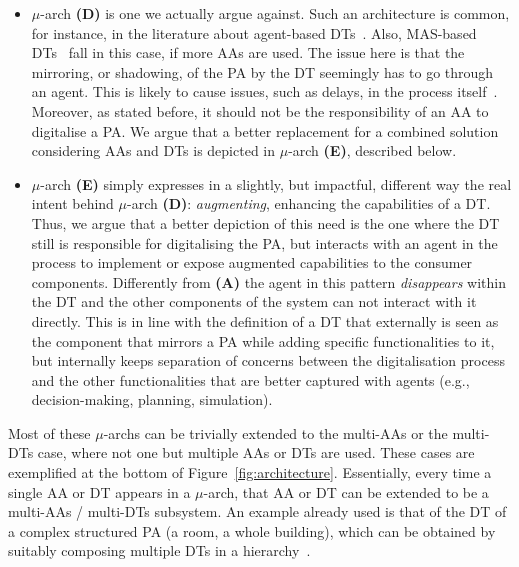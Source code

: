 \begin{itemize}
    \item $\mu$-arch \textbf{(D)} is one we actually argue against. 
    Such an architecture is common, for instance, in the literature about agent-based DTs~\cite{AlelaimatGD20,s21041096}. 
    Also, MAS-based DTs~\cite{WAN2021880,Pretel2024} fall in this case, if more AAs are used. 
    The issue here is that the mirroring, or shadowing, of the PA by the DT seemingly has to go through an agent. 
    This is likely to cause issues, such as delays, in the process itself~\cite{calvaresi2017challenge}. 
    Moreover, as stated before, it should not be the responsibility of an AA to digitalise a PA. 
    We argue that a better replacement for a combined solution considering AAs and DTs is depicted in $\mu$-arch \textbf{(E)}, described below. 
    \item $\mu$-arch \textbf{(E)} simply expresses in a slightly, but impactful, different way the real intent behind $\mu$-arch \textbf{(D)}: \emph{augmenting}, enhancing the capabilities of a DT. 
    Thus, we argue that a better depiction of this need is the one where the DT still is responsible for digitalising the PA, but interacts with an agent in the process to implement or expose augmented capabilities to the consumer components.
    Differently from \textbf{(A)} the agent in this pattern \textit{disappears} within the DT and the other components of the system can not interact with it directly. This is in line with the definition of a DT that externally is seen as the component that mirrors a PA while adding specific functionalities to it, but internally keeps separation of concerns between the digitalisation process and the other functionalities that are better captured with agents (e.g., decision-making, planning, simulation).
    
\end{itemize}
%
Most of these $\mu$-archs can be trivially extended to the multi-AAs or the multi-DTs case, where not one but multiple AAs or DTs are used. 
These cases are exemplified at the bottom of Figure~\ref{fig:architecture}. 
Essentially, every time a single AA or DT appears in a $\mu$-arch, that AA or DT can be extended to be a multi-AAs / multi-DTs subsystem. 
An example already used is that of the DT of a complex structured PA (a room, a whole building), which can be obtained by suitably composing multiple DTs in a hierarchy~\cite{Jia2022}.


